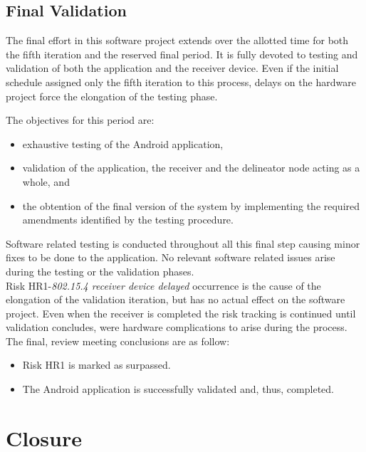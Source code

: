 		\subsection{Final Validation}
			The final effort in this software project extends over the allotted time for both the fifth iteration and the reserved final period. It is fully devoted to testing and validation of both the application and the receiver device. Even if the initial schedule assigned only the fifth iteration to this process, delays on the hardware project  force the elongation of the testing phase.

			The objectives for this period are:
			\begin{itemize}
				\item exhaustive testing of the Android application,
				\item validation of the application, the receiver and the delineator node acting as a whole, and
				\item the obtention of the final version of the system by implementing the required amendments identified by the testing procedure.
			\end{itemize}

			Software related testing is conducted throughout all this final step causing minor fixes to be done to the application. No relevant software related issues arise during the testing or the validation phases.\\

			Risk HR1-\emph{802.15.4 receiver device delayed} occurrence is the cause of the elongation of the validation iteration, but has no actual effect on the software project. Even when the receiver is completed  the risk tracking is continued until validation concludes, were hardware complications to arise during the process.\\

			The final, review meeting conclusions are as follow:
			\begin{itemize}
				\item Risk HR1 is marked as surpassed.
				\item The Android application is successfully validated and, thus, completed.
			\end{itemize}
			
	\section{Closure}
